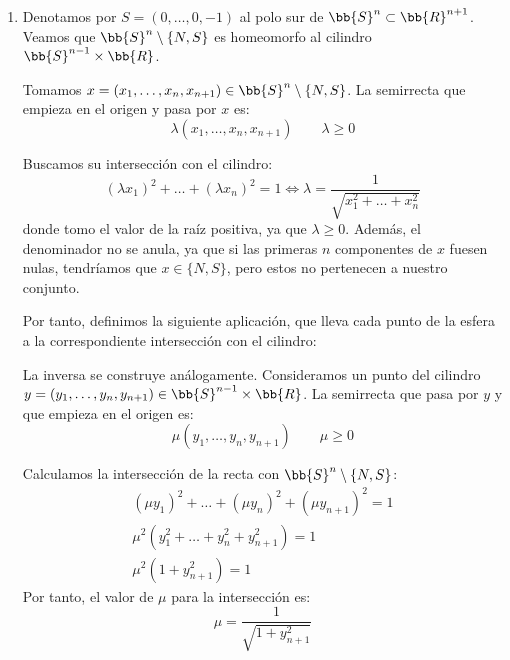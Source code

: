 \begin{ejemplo}
\begin{enumerate}
        \item Denotamos por $S=(0,\dots,0,-1)$ al polo sur de $\bb{S}^n\subset \bb{R}^{n+1}$.
        Veamos que $\bb{S}^n\setminus \{N,S\}$ es homeomorfo al cilindro $\bb{S}^{n-1}\times \bb{R}$.

        Tomamos $x=(x_1,\dots,x_n,x_{n+1})\in \bb{S}^n\setminus \{N,S\}$. La semirrecta que empieza en el origen y pasa por $x$ es:
        \begin{equation*}
            \lambda (x_1,\dots,x_n,x_{n+1}) \qquad \lambda\geq 0
        \end{equation*}

        Buscamos su intersección con el cilindro:
        \begin{equation*}
            (\lambda x_1)^2 +\dots +(\lambda x_n)^2= 1\Longleftrightarrow \lambda = \frac{1}{\sqrt{x_1^2+\dots+x_n^2}}
        \end{equation*}
        donde tomo el valor de la raíz positiva, ya que $\lambda\geq 0$. Además, el denominador no se anula, ya que si las primeras $n$ componentes de $x$ fuesen nulas, tendríamos que $x\in \{N,S\}$, pero estos no pertenecen a nuestro conjunto.

        Por tanto, definimos la siguiente aplicación, que lleva cada punto de la esfera a la correspondiente intersección con el cilindro:

        La inversa se construye análogamente. Consideramos un punto del cilindro $y=(y_1,\dots,y_n, y_{n+1})\in \bb{S}^{n-1}\times \bb{R}$. La semirrecta que pasa por $y$ y que empieza en el origen es:
        \begin{equation*}
            \mu (y_1,\dots,y_n,y_{n+1}) \qquad \mu\geq 0
        \end{equation*}

        Calculamos la intersección de la recta con $\bb{S}^n\setminus \{N,S\}$:
        \begin{gather*}
            (\mu y_1)^2 + \dots + (\mu y_n)^2 +(\mu y_{n+1})^2 = 1\\
            \mu^2(y_1^2+\dots + y_n^2 + y_{n+1}^2)=1\\
            \mu^2(1 + y_{n+1}^2)=1
        \end{gather*}
        Por tanto, el valor de $\mu$ para la intersección es:
        \begin{equation*}
            \mu=\frac{1}{\sqrt{1+y_{n+1}^2}}
        \end{equation*}


\end{enumerate}
\end{ejemplo}
